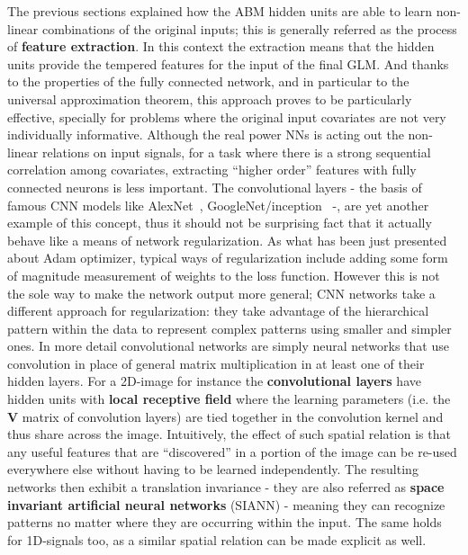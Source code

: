 The previous sections explained how the \ac{ABM} hidden units are able to learn non-linear combinations of the original inputs; this is generally referred as the process of \textbf{feature extraction}. In this context the extraction means that the hidden units provide the tempered features for the input of the final \ac{GLM}. 
%
And thanks to the properties of the fully connected network, and in particular to the universal approximation theorem, this approach proves to be particularly effective, specially for problems where the original input covariates are not very individually informative. 
Although the real power NNs is acting out the non-linear relations on input signals, for a task where there is a strong sequential correlation among covariates, extracting “higher order” features with fully connected neurons is less important.
%
The convolutional layers - the basis of famous \ac{CNN} models like AlexNet~\cite{Krizhevsky:2012:ICD:2999134.2999257}, GoogleNet/inception~\cite{7298594} -, are yet another example of this concept, thus it should not be surprising fact that it actually behave like a means of network regularization.
%
As what has been just presented about Adam optimizer, typical ways of regularization include adding some form of magnitude measurement of weights to the loss function. However this is not the sole way to make the network output more general; \acl{CNN} networks take a different approach for regularization: they take advantage of the hierarchical pattern within the data to represent complex patterns using smaller and simpler ones. 
In more detail convolutional networks are simply neural networks that use convolution in place of general matrix multiplication in at least one of their hidden layers.
For a 2D-image for instance the \textbf{convolutional layers} have hidden units with \textbf{local receptive field} where the learning parameters (i.e. the $\bm{V}$ matrix of convolution layers) are tied together in the convolution kernel and thus share across the image. Intuitively, the effect of such spatial relation is that any useful features that are “discovered” in a portion
of the image can be re-used everywhere else without having to be learned independently. The resulting networks then exhibit a translation invariance - they are also referred as \textbf{space invariant artificial neural networks} (SIANN) - meaning they can recognize patterns no matter where they are occurring within the input.
The same holds for 1D-signals too, as a similar spatial relation can be made explicit as well.

